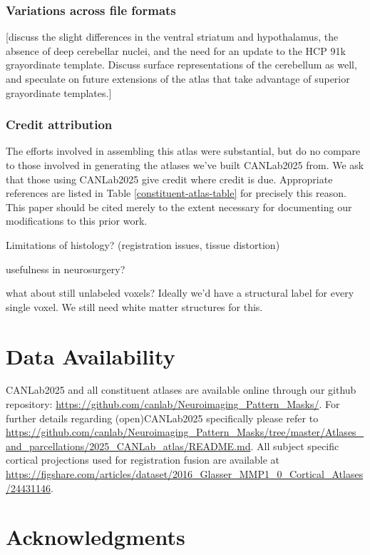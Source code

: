 \documentclass[10pt,letterpaper]{article}
\begin{document}
\subsubsection{Variations across file formats}
[discuss the slight differences in the ventral striatum and hypothalamus, the absence of deep cerebellar nuclei, and the need for an update to the HCP 91k grayordinate template. Discuss surface representations of the cerebellum as well, and speculate on future extensions of the atlas that take advantage of superior grayordinate templates.]

\subsubsection{Credit attribution}
The efforts involved in assembling this atlas were substantial, but do no compare to those involved in generating the atlases we've built CANLab2025 from. We ask that those using CANLab2025 give credit where credit is due. Appropriate references are listed in Table \ref{constituent-atlas-table} for precisely this reason. This paper should be cited merely to the extent necessary for documenting our modifications to this prior work.


Limitations of histology? (registration issues, tissue distortion)

usefulness in neurosurgery?

what about still unlabeled voxels? Ideally we'd have a structural label for every single voxel. We still need white matter structures for this.


\section{Data Availability}
CANLab2025 and all constituent atlases are available online through our github repository: \url{https://github.com/canlab/Neuroimaging_Pattern_Masks/}. For further details regarding (open)CANLab2025 specifically please refer to \url{https://github.com/canlab/Neuroimaging_Pattern_Masks/tree/master/Atlases_and_parcellations/2025_CANLab_atlas/README.md}. All subject specific cortical projections used for registration fusion are available at \url{https://figshare.com/articles/dataset/2016_Glasser_MMP1_0_Cortical_Atlases/24431146}. 

\section{Acknowledgments}
\end{document}
